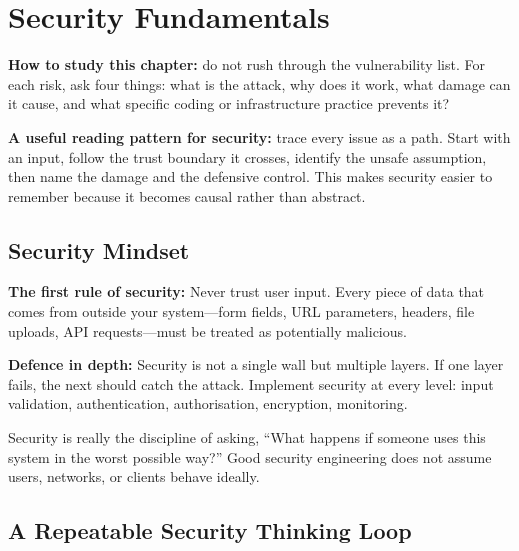 \documentclass[12pt, a4paper, oneside]{book}
\begin{document}
\chapter{Security Fundamentals}

\begin{studybox}
\textbf{How to study this chapter:} do not rush through the vulnerability list. For each risk, ask four things: what is the attack, why does it work, what damage can it cause, and what specific coding or infrastructure practice prevents it?
\end{studybox}

\begin{notebox}
\textbf{A useful reading pattern for security:} trace every issue as a path. Start with an input, follow the trust boundary it crosses, identify the unsafe assumption, then name the damage and the defensive control. This makes security easier to remember because it becomes causal rather than abstract.
\end{notebox}

\section{Security Mindset}

\textbf{The first rule of security:} Never trust user input. Every piece of data that comes from outside your system---form fields, URL parameters, headers, file uploads, API requests---must be treated as potentially malicious.

\textbf{Defence in depth:} Security is not a single wall but multiple layers. If one layer fails, the next should catch the attack. Implement security at every level: input validation, authentication, authorisation, encryption, monitoring.

\begin{intuitionbox}
Security is really the discipline of asking, ``What happens if someone uses this system in the worst possible way?'' Good security engineering does not assume users, networks, or clients behave ideally.
\end{intuitionbox}

\section{A Repeatable Security Thinking Loop}
\end{document}
